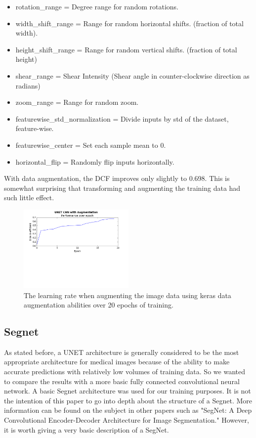 \documentclass[letterpaper]{article}
\begin{document}
\begin{itemize}
  \item rotation\_range = Degree range for random rotations.
  \item width\_shift\_range =  Range for random horizontal shifts. (fraction of total width). 
  \item height\_shift\_range = Range for random vertical shifts. (fraction of total height)
  \item shear\_range = Shear Intensity (Shear angle in counter-clockwise direction as radians)
  \item zoom\_range = Range for random zoom.
  \item featurewise\_std\_normalization = Divide inputs by std of the dataset, feature-wise.
  \item featurewise\_center = Set each sample mean to 0.
  \item horizontal\_flip = Randomly flip inputs horizontally.
\end{itemize}

With data augmentation, the DCF improves only slightly to 0.698. This is somewhat surprising that transforming and augmenting the training data had such little effect.

 \begin{figure}[H]
  \centerline{\includegraphics[width=0.5\textwidth]{Plots/UNETSimple20Augmented.png}}
  \caption{The learning rate when augmenting the image data using keras data augmentation abilities over 20 epochs of training.}
  \label{fig:unet3}
\end{figure}

\subsection{Segnet}
As stated before, a UNET architecture is generally considered to be the most appropriate architecture for medical images because of the ability to make accurate predictions with relatively low volumes of training data. So we wanted to compare the results with a more basic fully connected convolutional neural network. A basic Segnet architecture was used for our training purposes. It is not the intention of this paper to go into depth about the structure of a Segnet. More information can be found on the subject in other papers such as "SegNet: A Deep Convolutional Encoder-Decoder Architecture for Image Segmentation." \cite{badrinarayanan2015segnet} However, it is worth giving a very basic description of a SegNet. 
\end{document}
